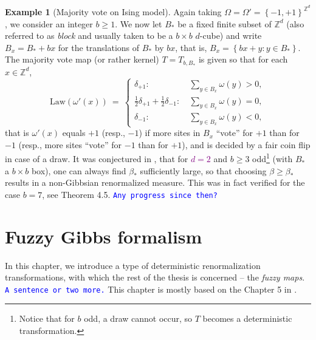 \documentclass[12pt]{article}
\newcommand{\Z}{\mathbb{Z}}
\newcommand{\set}[1]{\left\{#1\right\}}
\newcommand{\1}{\mathbbm{1}}
\newcommand{\5}{\vspace{0.5cm}}
\theoremstyle{definition}
\newtheorem{ex}[thm]{Example}
\begin{document}
\begin{ex}[Majority vote on Ising model]
Again taking $\Omega=\Omega'=\set{-1,+1}^{\Z^d}$, we consider an integer $b\geq 1$. We now let $B_*$ be a fixed finite subset of $\Z^d$ (also referred to as \textit{block} and usually taken to be a $b\times b$ $d$-cube) and write $B_x=B_*+bx$ for the translations of $B_*$ by $bx$, that is, $B_x=\set{bx+y:y\in B_*}$. The majority vote map (or rather kernel) $T=T_{b,B_*}$ is given so that for each $x\in\Z^d$,
$$\mathrm{Law}(\omega'(x)) ~=~ \begin{cases}
\delta_{+1}: ~&\sum_{y\in B_x}\omega(y)>0, \\
\frac{1}{2}\delta_{+1}+\frac{1}{2}\delta_{-1}: ~&\sum_{y\in B_x}\omega(y)=0, \\
\delta_{-1}: ~&\sum_{y\in B_x}\omega(y)<0,
\end{cases}$$
that is $\omega'(x)$ equals $+1$ (resp., $-1$) if more sites in $B_x$ ``vote'' for $+1$ than for $-1$ (resp., more sites ``vote'' for $-1$ than for $+1$), and is decided by a fair coin flip in case of a draw. It was conjectured in \cite{EFS}, that for \textcolor{purple}{$d=2$} and $b\geq 3$ odd\footnote{Notice that for $b$ odd, a draw cannot occur, so $T$ becomes a deterministic transformation.} (with $B_*$ a $b\times b$ box), one can always find $\beta_*$ sufficiently large, so that choosing $\beta\geq\beta_*$ results in a non-Gibbsian renormalized measure. This was in fact verified for the case $b=7$, see Theorem 4.5. \textcolor{blue}{\texttt{Any progress since then?}}
\end{ex}


\pagebreak


\section{Fuzzy Gibbs formalism}

In this chapter, we introduce a type of deterministic renormalization transformations, with which the rest of the thesis is concerned -- the \textit{fuzzy maps}. \textcolor{blue}{\texttt{A sentence or two more.}} This chapter is mostly based on the Chapter 5 in \cite{Ber}.
\end{document}

